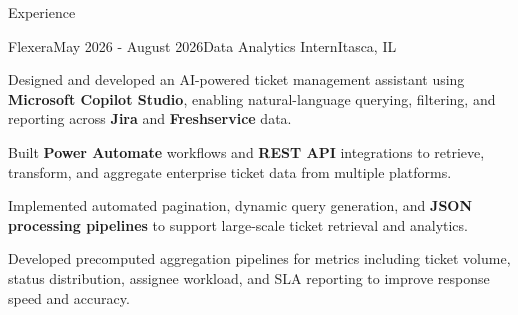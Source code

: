 \documentclass{resume} %
\begin{document}
\begin{rSection}{Experience}

\begin{rSubsection}{Flexera}{May 2026 - August 2026}{Data Analytics Intern}{Itasca, IL}
\item \textmd{Designed and developed an AI-powered ticket management assistant using \textbf{Microsoft Copilot Studio}, enabling natural-language querying, filtering, and reporting across \textbf{Jira} and \textbf{Freshservice} data.}

\item \textmd{Built \textbf{Power Automate} workflows and \textbf{REST API} integrations to retrieve, transform, and aggregate enterprise ticket data from multiple platforms.}

\item \textmd{Implemented automated pagination, dynamic query generation, and \textbf{JSON processing pipelines} to support large-scale ticket retrieval and analytics.}

\item \textmd{Developed precomputed aggregation pipelines for metrics including ticket volume, status distribution, assignee workload, and SLA reporting to improve response speed and accuracy.}
\end{rSubsection}

\end{rSection}

\end{document}
